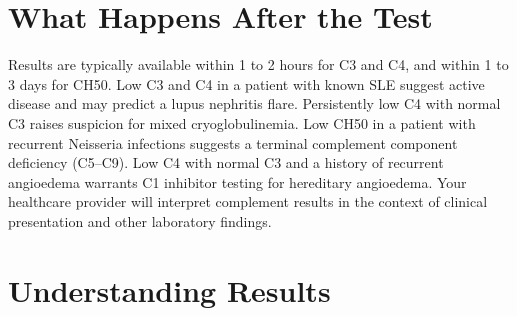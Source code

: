 \section*{What Happens After the Test}
Results are typically available within 1 to 2 hours for C3 and C4, and within 1 to 3 days for CH50. Low C3 and C4 in a patient with known SLE suggest active disease and may predict a lupus nephritis flare. Persistently low C4 with normal C3 raises suspicion for mixed cryoglobulinemia. Low CH50 in a patient with recurrent Neisseria infections suggests a terminal complement component deficiency (C5--C9). Low C4 with normal C3 and a history of recurrent angioedema warrants C1 inhibitor testing for hereditary angioedema. Your healthcare provider will interpret complement results in the context of clinical presentation and other laboratory findings.

\section*{Understanding Results}


